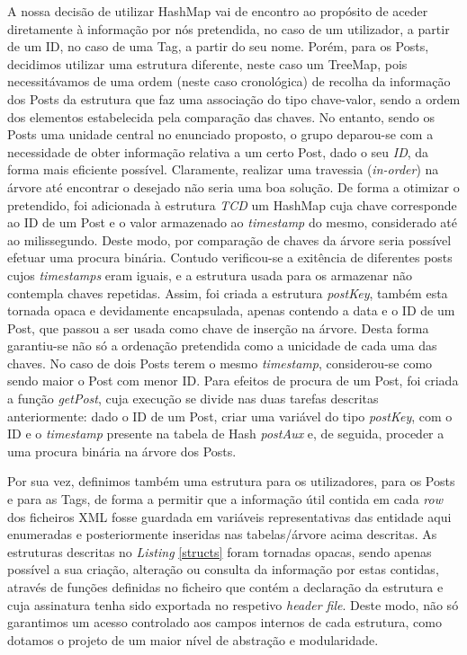 \documentclass[a4paper, 11pt, oneside]{article}
\begin{document}
A nossa decisão de utilizar HashMap vai de encontro ao propósito de aceder diretamente à informação por nós pretendida, no caso de um utilizador, a partir de um ID, no caso
de uma Tag, a partir do seu nome. Porém, para os Posts, decidimos utilizar uma estrutura diferente, neste caso um TreeMap, pois necessitávamos de uma ordem (neste caso 
cronológica) de recolha da informação dos Posts da estrutura que faz uma associação do tipo chave-valor, sendo a ordem dos elementos estabelecida pela comparação das chaves. 
No entanto, sendo os Posts uma unidade central no enunciado proposto, o grupo deparou-se com a necessidade de obter informação relativa a um certo Post, dado o seu \textit{ID}, 
da forma mais eficiente possível. Claramente, realizar uma travessia (\textit{in-order}) na árvore até encontrar o desejado não seria uma boa solução. De forma a otimizar o 
pretendido, foi adicionada à estrutura \textit{TCD} um HashMap cuja chave corresponde ao ID de um Post e o valor armazenado ao \textit{timestamp} do mesmo, considerado até ao 
milissegundo. Deste modo, por comparação de chaves da árvore seria possível efetuar uma procura binária. Contudo verificou-se a exitência de diferentes posts cujos \textit{
timestamps} eram iguais, e a estrutura usada para os armazenar não contempla chaves repetidas. Assim, foi criada a estrutura \textit{postKey}, também esta tornada opaca e 
devidamente encapsulada, apenas contendo a data e o ID de um Post, que passou a ser usada como chave de inserção na árvore. Desta forma garantiu-se não só a ordenação pretendida 
como a unicidade de cada uma das chaves. No caso de dois Posts terem o mesmo \textit{timestamp}, considerou-se como sendo maior o Post com menor ID. Para efeitos de procura de 
um Post, foi criada a função \textit{getPost}, cuja execução se divide nas duas tarefas descritas anteriormente: dado o ID de um Post, criar uma variável do tipo 
\textit{postKey}, com o ID e o \textit{timestamp} presente na tabela de Hash \textit{postAux} e, de seguida, proceder a uma procura binária na árvore dos Posts.

Por sua vez, definimos também uma estrutura para os utilizadores, para os Posts e para as Tags, de forma a permitir que a informação útil contida em cada \textit{row} dos 
ficheiros XML fosse guardada em variáveis representativas das entidade aqui enumeradas e posteriormente inseridas nas tabelas/árvore acima descritas. As estruturas descritas 
no \textit{Listing} \ref{structs} foram tornadas opacas, sendo apenas possível a sua criação, alteração ou consulta da informação por estas contidas, através de funções 
definidas no ficheiro que contém a declaração da estrutura e cuja assinatura tenha sido exportada no respetivo \textit{header file}. Deste modo, não só garantimos um acesso 
controlado aos campos internos de cada estrutura, como dotamos o projeto de um maior nível de abstração e modularidade.
\end{document}
